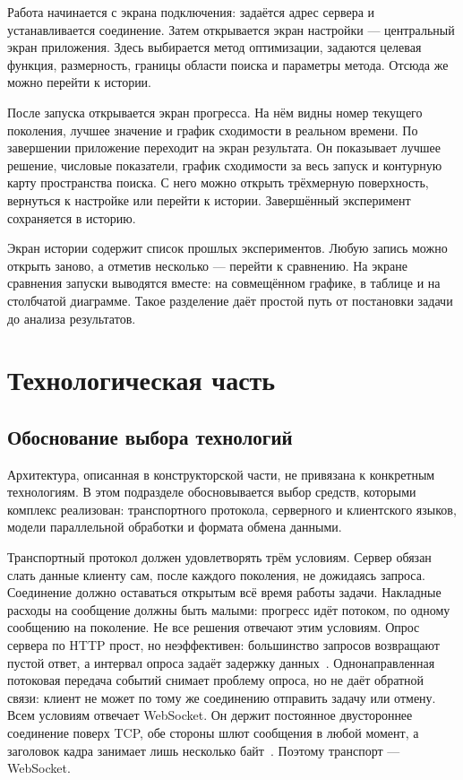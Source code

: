 \documentclass[14pt, a4paper]{extarticle}
\begin{document}
Работа начинается с экрана подключения: задаётся адрес сервера и устанавливается
соединение. Затем открывается экран настройки --- центральный экран приложения.
Здесь выбирается метод оптимизации, задаются целевая функция, размерность, границы
области поиска и параметры метода. Отсюда же можно перейти к истории.

После запуска открывается экран прогресса. На нём видны номер текущего поколения,
лучшее значение и график сходимости в реальном времени. По завершении приложение
переходит на экран результата. Он показывает лучшее решение, числовые показатели,
график сходимости за весь запуск и контурную карту пространства поиска. С него
можно открыть трёхмерную поверхность, вернуться к настройке или перейти к истории.
Завершённый эксперимент сохраняется в историю.

Экран истории содержит список прошлых экспериментов. Любую запись можно открыть
заново, а отметив несколько --- перейти к сравнению. На экране сравнения запуски
выводятся вместе: на совмещённом графике, в таблице и на столбчатой диаграмме.
Такое разделение даёт простой путь от постановки задачи до анализа результатов.

\section{Технологическая часть}\label{sec:technology}

\subsection{Обоснование выбора технологий}
\label{subsec:stack}

Архитектура, описанная в конструкторской части, не привязана к конкретным
технологиям. В этом подразделе обосновывается выбор средств, которыми
комплекс реализован: транспортного протокола, серверного и клиентского
языков, модели параллельной обработки и формата обмена данными.

Транспортный протокол должен удовлетворять трём условиям. Сервер обязан слать
данные клиенту сам, после каждого поколения, не дожидаясь запроса. Соединение
должно оставаться открытым всё время работы задачи. Накладные расходы на сообщение
должны быть малыми: прогресс идёт потоком, по одному сообщению на поколение. Не все
решения отвечают этим условиям. Опрос сервера по HTTP прост, но неэффективен:
большинство запросов возвращают пустой ответ, а интервал опроса задаёт задержку
данных~\cite{olifer2016}. Однонаправленная потоковая передача событий снимает
проблему опроса, но не даёт обратной связи: клиент не может по тому же соединению
отправить задачу или отмену. Всем условиям отвечает WebSocket. Он держит постоянное
двустороннее соединение поверх TCP, обе стороны шлют сообщения в любой момент, а
заголовок кадра занимает лишь несколько байт~\cite{fedulov2025}. Поэтому транспорт
--- WebSocket.
\end{document}

